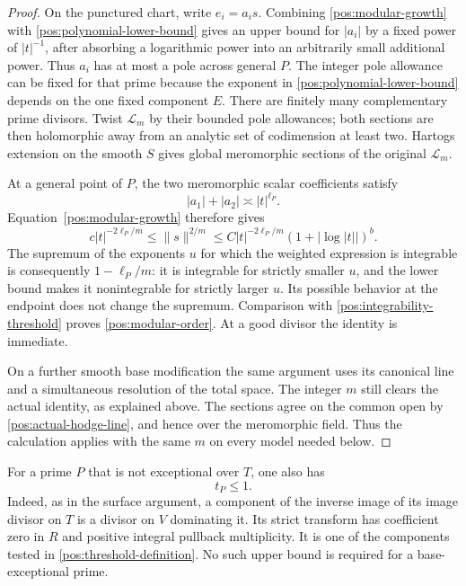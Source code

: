 \begin{proof}
On the punctured chart, write \(e_i=a_i s\). Combining
\eqref{pos:modular-growth} with
\eqref{pos:polynomial-lower-bound} gives an upper bound for
\(|a_i|\) by a fixed power of \(|t|^{-1}\), after absorbing a
logarithmic power into an arbitrarily small additional power. Thus
\(a_i\) has at most a pole across general \(P\). The integer pole
allowance can be fixed for that prime because the exponent in
\eqref{pos:polynomial-lower-bound} depends on the one fixed component
\(E\). There are finitely many complementary prime divisors. Twist
\(\mathcal L_m\) by their bounded pole allowances; both sections
are then holomorphic away from an analytic set of codimension at
least two. Hartogs extension on the smooth \(S\) gives global
meromorphic sections of the original \(\mathcal L_m\).

At a general point of \(P\), the two meromorphic scalar coefficients
satisfy
\[
 |a_1|+|a_2|\asymp |t|^{\ell_P}.
\]
Equation~\eqref{pos:modular-growth} therefore gives
\begin{equation}\label{pos:frame-order-growth}
 c|t|^{-2\ell_P/m}
 \leq\|s\|^{2/m}
 \leq C|t|^{-2\ell_P/m}(1+|\log|t||)^b.
\end{equation}
The supremum of the exponents \(u\) for which the weighted expression
is integrable is consequently \(1-\ell_P/m\): it is integrable for
strictly smaller \(u\), and the lower bound makes it nonintegrable
for strictly larger \(u\). Its possible behavior at the endpoint
does not change the supremum. Comparison with
\eqref{pos:integrability-threshold} proves
\eqref{pos:modular-order}. At a good divisor the identity is immediate.

On a further smooth base modification the same argument uses its
canonical line and a simultaneous resolution of the total space.
The integer \(m\) still clears the actual identity, as explained
above. The sections agree on the common open by
\eqref{pos:actual-hodge-line}, and hence over the meromorphic field.
Thus the calculation applies with the same \(m\) on every model
needed below.
\end{proof}

For a prime \(P\) that is not exceptional over \(T\), one also has
\begin{equation}\label{pos:nonexceptional-threshold}
 t_P\leq1.
\end{equation}
Indeed, as in the surface argument, a component of the inverse image
of its image divisor on \(T\) is a divisor on \(V\) dominating it.
Its strict transform has coefficient zero in \(R\) and positive
integral pullback multiplicity. It is one of the components tested in
\eqref{pos:threshold-definition}. No such upper bound is required
for a base-exceptional prime.


